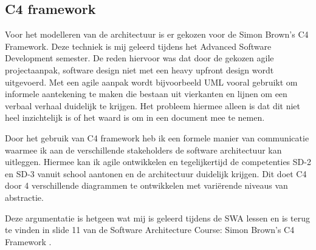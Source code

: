 \subsection{C4 framework}
Voor het modelleren van de architectuur is er gekozen voor de Simon Brown’s C4 Framework. Deze techniek is mij geleerd tijdens het Advanced Software Development semester. De reden hiervoor was dat door de gekozen agile projectaanpak, software design niet met een heavy upfront design wordt uitgevoerd. Met een agile aanpak wordt bijvoorbeeld UML vooral gebruikt om informele aantekening te maken die bestaan uit vierkanten en lijnen om een verbaal verhaal duidelijk te krijgen. Het probleem hiermee alleen is dat dit niet heel inzichtelijk is of het waard is om in een document mee te nemen.\par
Door het gebruik van C4 framework heb ik een formele manier van communicatie waarmee ik aan de verschillende stakeholders de software architectuur kan uitleggen. Hiermee kan ik agile ontwikkelen en tegelijkertijd de competenties SD-2 en SD-3 vanuit school aantonen en de architectuur duidelijk krijgen. Dit doet C4 door 4 verschillende diagrammen te ontwikkelen met variërende niveaus van abstractie.\par
Deze argumentatie is hetgeen wat mij is geleerd tijdens de SWA lessen en is terug te vinden in slide 11 van de Software Architecture Course: Simon Brown’s C4 Framework \cite{swa11}.